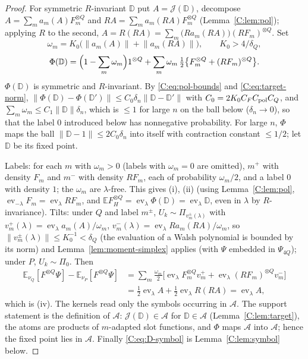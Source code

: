 \documentclass[11pt]{article}
\DeclareMathOperator{\ev}{ev}
\newcommand{\E}{\mathbb{E}}
\newcommand{\cA}{\mathcal{A}}
\newcommand{\cJ}{\mathcal{J}}
\newcommand{\norm}[1]{\lVert #1\rVert}
\begin{document}
\begin{proof}
For symmetric \(R\)-invariant \(\mathbb D\) put
\(A=\cJ(\mathbb D)\), decompose \(A=\sum_ma_m(A)F_m^{\otimes Q}\) and
\(RA=\sum_ma_m(RA)F_m^{\otimes Q}\) (Lemma~\ref{C:lem:pol}); applying \(R\)
to the second, \(A=R(RA)=\sum_m\bigl(Ra_m(RA)\bigr)(RF_m)^{\otimes Q}\).  Set
\[
 \omega_m=K_0\bigl(\norm{a_m(A)}+\norm{a_m(RA)}\bigr),\qquad K_0>4/\delta_Q,
\]
\[
 \Phi(\mathbb D)=\Bigl(1-\sum_m\omega_m\Bigr)1^{\otimes Q}
 +\sum_m\omega_m\,\tfrac12\bigl\{F_m^{\otimes Q}+(RF_m)^{\otimes Q}\bigr\}.
\]
\(\Phi(\mathbb D)\) is symmetric and \(R\)-invariant.  By
\eqref{C:eq:pol-bounds} and \eqref{C:eq:target-norm},
\(\norm{\Phi(\mathbb D)-\Phi(\mathbb D')}\le C_0\delta_n\norm{\mathbb D-\mathbb D'}\)
with \(C_0=2K_0C_FC_{\rm pol}C_Q\), and \(\sum_m\omega_m\le C_1\norm{\mathbb D}\delta_n\),
which is \(\le1\) for large \(n\) on the ball below (\(\delta_n\to0\)), so
that the label \(0\) introduced below has nonnegative probability.
For large \(n\), \(\Phi\) maps the ball \(\norm{\mathbb D-1}\le2C_0\delta_n\) into
itself with contraction constant \(\le1/2\); let \(\mathbb D\) be its fixed
point.

Labels: for each \(m\) with \(\omega_m>0\) (labels with \(\omega_m=0\) are
omitted), \(m^+\) with density \(F_m\) and \(m^-\) with density \(RF_m\),
each of probability \(\omega_m/2\), and a label \(0\) with density \(1\);
the \(\omega_m\) are \(\lambda\)-free.  This gives (i), (ii) (using
Lemma~\ref{C:lem:pol}, \(\ev_{-\lambda}F_m=\ev_\lambda RF_m\), and
\(\E F_H^{\otimes Q}=\ev_\lambda\Phi(\mathbb D)=\ev_\lambda\mathbb D\), even in
\(\lambda\) by \(R\)-invariance).  Tilts: under \(Q\) and label \(m^\pm\),
\(U_k\sim\Pi_{v^\pm_m(\lambda)}\) with
\(v^+_m(\lambda)=\ev_\lambda a_m(A)/\omega_m\), \(v^-_m(\lambda)=\ev_\lambda Ra_m(RA)/\omega_m\),
so \(\norm{v^\pm_m(\lambda)}\le K_0^{-1}<\delta_Q\) (the evaluation of a Walsh
polynomial is bounded by its norm) and Lemma~\ref{lem:moment-simplex}
applies (with \(\Psi\) embedded in \(\Psi_{4Q}\)); under \(P\), \(U_k\sim\Pi_0\).  Then
\[
 \begin{aligned}
 \E_{\nu_Q}[F^{\otimes Q}\Psi]-\E_{\nu_P}[F^{\otimes Q}\Psi]
 &=\sum_m\tfrac{\omega_m}2
   \bigl[\ev_\lambda F_m^{\otimes Q}v^+_m
          +\ev_\lambda(RF_m)^{\otimes Q}v^-_m\bigr]\\
 &=\tfrac12\ev_\lambda A+\tfrac12\ev_\lambda R(RA)
   =\ev_\lambda A,
 \end{aligned}
\]
which is (iv).  The kernels read only the symbols occurring in \(\cA\).
The support statement is the definition of \(\cA\): \(\cJ(\mathbb D)\in\cA\)
for \(\mathbb D\in\cA\) (Lemma~\ref{C:lem:target}), the atoms are products of
\(m\)-adapted slot functions, and \(\Phi\) maps \(\cA\) into \(\cA\); hence the
fixed point lies in \(\cA\).  Finally \eqref{C:eq:D-symbol} is
Lemma~\ref{C:lem:symbol} below.
\end{proof}
\end{document}
